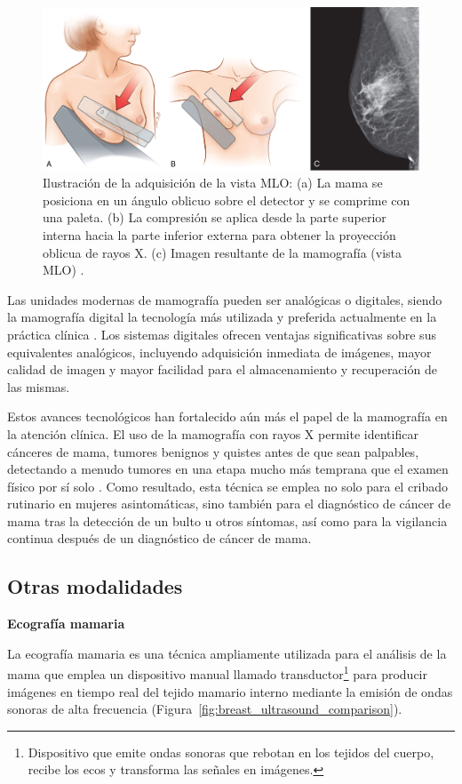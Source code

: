 \documentclass[a4paper,10pt]{book}
\begin{document}
\begin{figure}[h!]
    \centering
    \includegraphics[width=0.6\linewidth]{reports//assets/mlo_view.jpg}
    \caption[Procedimiento de adquisición de la vista MLO]{Ilustración de la adquisición de la vista MLO: (a) La mama se posiciona en un ángulo oblicuo sobre el detector y se comprime con una paleta. (b) La compresión se aplica desde la parte superior interna hacia la parte inferior externa para obtener la proyección oblicua de rayos X. (c) Imagen resultante de la mamografía (vista MLO) \cite{imaging_introduction_2022}.}
    \label{fig:mlo_view}
\end{figure}


Las unidades modernas de mamografía pueden ser analógicas o digitales, siendo la mamografía digital la tecnología más utilizada y preferida actualmente en la práctica clínica \cite{ltd_mammography_2025, noauthor_mammography_nodate}. Los sistemas digitales ofrecen ventajas significativas sobre sus equivalentes analógicos, incluyendo adquisición inmediata de imágenes, mayor calidad de imagen y mayor facilidad para el almacenamiento y recuperación de las mismas.

Estos avances tecnológicos han fortalecido aún más el papel de la mamografía en la atención clínica. El uso de la mamografía con rayos X permite identificar cánceres de mama, tumores benignos y quistes antes de que sean palpables, detectando a menudo tumores en una etapa mucho más temprana que el examen físico por sí solo \cite{staff_what_2025}. Como resultado, esta técnica se emplea no solo para el cribado rutinario en mujeres asintomáticas, sino también para el diagnóstico de cáncer de mama tras la detección de un bulto u otros síntomas, así como para la vigilancia continua después de un diagnóstico de cáncer de mama.


\subsection{Otras modalidades}

\textbf{Ecografía mamaria}

La ecografía mamaria es una técnica ampliamente utilizada para el análisis de la mama que emplea un dispositivo manual llamado transductor\footnote{Dispositivo que emite ondas sonoras que rebotan en los tejidos del cuerpo, recibe los ecos y transforma las señales en imágenes.} para producir imágenes en tiempo real del tejido mamario interno mediante la emisión de ondas sonoras de alta frecuencia (Figura~\ref{fig:breast_ultrasound_comparison}).
\end{document}
